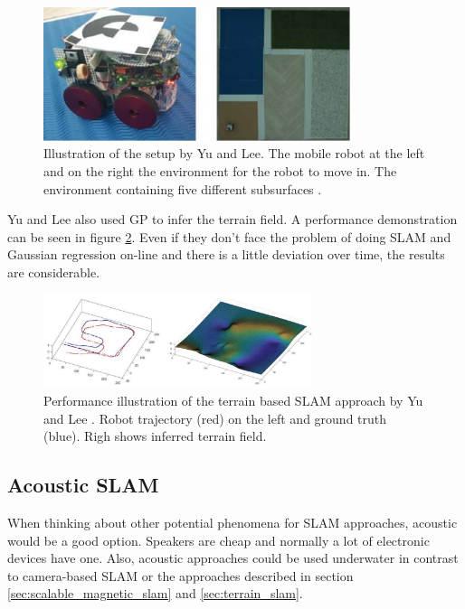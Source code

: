 \begin{figure}[h!]
	\centering
	\captionsetup{justification=centering,margin=1cm}
	\includegraphics[width=0.8\textwidth]{images/yu_setup.png}
	\caption{
		Illustration of the setup by Yu and Lee. The mobile robot at the left and
		on the right the environment for the robot to move in. The environment containing
		five different subsurfaces \cite{yu_terrain_2018}.
	}
	\label{fig:yu_setup}
\end{figure}

Yu and Lee also used GP to infer the terrain field. A performance demonstration can be seen in figure \ref{fig:yu_performance}. Even if they don't face the problem of doing SLAM and Gaussian regression on-line and there is a little deviation over time, the results are considerable.


\begin{figure}[h!]
	\centering
	\captionsetup{justification=centering,margin=1cm}
	\includegraphics[width=0.7\textwidth]{images/yu_performance.png}
	\caption{
		Performance illustration of the terrain based SLAM approach by Yu and Lee \cite{yu_terrain_2018}.
		Robot trajectory (red) on the left and ground truth (blue). Righ shows inferred terrain field.
	}
	\label{fig:yu_performance}
\end{figure}

\subsection{Acoustic SLAM}
\label{sec:acoustic_slam}

When thinking about other potential phenomena for SLAM approaches, acoustic would be a good option. Speakers are cheap and normally a lot of electronic devices have one. Also, acoustic approaches could be used underwater in contrast to camera-based SLAM or the approaches described in section \ref{sec:scalable_magnetic_slam} and \ref{sec:terrain_slam}.

